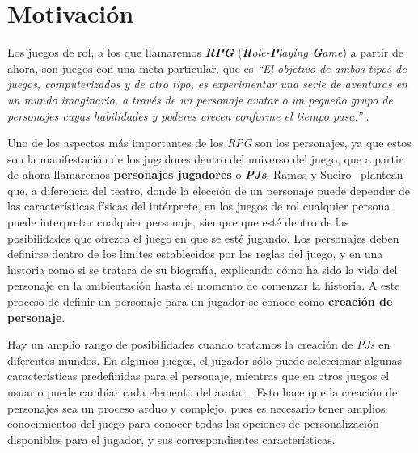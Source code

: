 
\section{Motivación} \label{Motivacion}
Los juegos de rol, a los que llamaremos \textbf{\textit{RPG}} (\textit{\textbf{R}ole-\textbf{P}laying \textbf{G}ame}) a 
partir de ahora, son juegos con una meta particular, que es \textit{“El objetivo de ambos tipos de juegos, computerizados y 
de otro tipo, es experimentar una serie de aventuras en un mundo imaginario, a través de un personaje avatar o un pequeño grupo de 
personajes cuyas habilidades y poderes crecen conforme el tiempo pasa.”} \autocite*{Adams2010}. \medskip

Uno de los aspectos más importantes de los \textit{RPG} son los personajes, ya que estos son la manifestación de los jugadores 
dentro del universo del juego, que a partir de ahora llamaremos \textbf{personajes jugadores} o \textbf{\textit{PJs}}. 
Ramos y Sueiro~\autocite*{Ramos-Villagrasa2010} plantean que, a diferencia del teatro, donde la elección de un personaje puede depender de las características 
físicas del intérprete, en los juegos de rol cualquier persona puede interpretar cualquier personaje, siempre que esté dentro de las 
posibilidades que ofrezca el juego en que se esté jugando. Los personajes deben definirse dentro de los limites establecidos por 
las reglas del juego, y en una historia como si se tratara de su biografía, explicando cómo ha sido la vida del personaje en 
la ambientación hasta el momento de comenzar la historia. A este proceso de definir un personaje 
para un jugador se conoce como \textbf{creación de personaje}. \medskip

Hay un amplio rango de posibilidades cuando tratamos la creación de \textit{PJs} en diferentes mundos. En algunos juegos, el jugador 
sólo puede seleccionar algunas características predefinidas para el personaje, mientras que en otros juegos el usuario puede cambiar cada
elemento del avatar \autocite*{Isaksson2012}. Esto hace que la creación de personajes sea un proceso arduo y complejo, pues es necesario 
tener amplios conocimientos del juego para conocer todas las opciones de personalización disponibles para el jugador, y sus correspondientes 
características. \medskip

